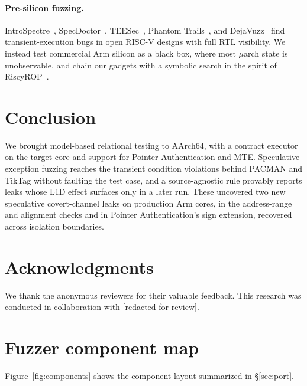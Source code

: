\documentclass[letterpaper,twocolumn,10pt]{article}
\makeatletter
\theoremstyle{definition}
\providecommand{\IS}{\ensuremath{\mathrm{IS}}}
\providecommand{\Al}{\ensuremath{\mathit{Attack}_{\mathrm{L1D}}}}
\providecommand{\AQ}[1]{\ensuremath{\mathit{Attack}^{Q}_{#1}}}
\providecommand{\lane}[1]{\ensuremath{L^{(#1)}}}
\providecommand{\inp}[2]{\ensuremath{I_{#1}^{(#2)}}}
\providecommand{\spl}[1]{\ensuremath{\sigma_{a\to b}(#1)}}
\providecommand{\tmax}{\ensuremath{t_{\max}}}
\def\uarch@bold#1#2\@nil{\if b#1\boldmath\fi}
\DeclareRobustCommand{\uarch}{{\expandafter\uarch@bold\f@series\@nil\ensuremath{\mu}}arch\xspace}
\makeatother
\begin{document}
\paragraph{Pre-silicon fuzzing.}
IntroSpectre~\cite{introspectre}, SpecDoctor~\cite{specdoctor},
TEESec~\cite{teesec}, Phantom Trails~\cite{phantom_trails}, and
DejaVuzz~\cite{dejavuzz} find transient-execution bugs in open RISC-V designs
with full RTL visibility. We instead test commercial Arm silicon as a black box,
where most \uarch state is unobservable, and chain our gadgets with a
symbolic search in the spirit of RiscyROP~\cite{riscyrop}.

\section{Conclusion}
\label{sec:conclusion}
We brought model-based relational testing to AArch64, with a contract executor on the target
core and support for Pointer Authentication and MTE.
Speculative-exception fuzzing reaches the transient condition violations behind PACMAN and
TikTag without faulting the test case, and a source-agnostic rule provably reports leaks
whose L1D effect surfaces only in a later run. These uncovered two new speculative
covert-channel leaks on production Arm cores, in the address-range and alignment checks and
in Pointer Authentication's sign extension, recovered across isolation boundaries.

\section*{Acknowledgments}
We thank the anonymous reviewers for their valuable feedback. This research was conducted in collaboration with [redacted for review].
 


{\footnotesize 
}

\appendix
\section{Fuzzer component map}
\label{app:components}
Figure~\ref{fig:components} shows the component layout summarized in \S\ref{sec:port}.
\end{document}
